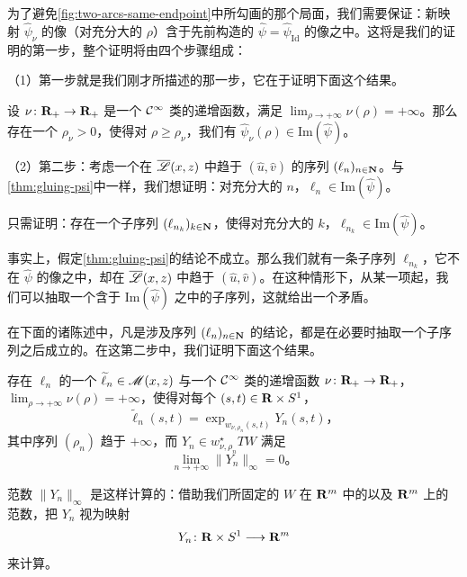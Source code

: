 为了避免\cref{fig:two-arcs-same-endpoint}中所勾画的那个局面，我们需要保证：新映射 $\widehat{\psi}_{\nu}$ 的像（对充分大的 $\rho$）含于先前构造的\trGluing{} $\widehat{\psi}=\widehat{\psi}_{\mathrm{Id}}$ 的像之中。这将是我们的证明的第一步，整个证明将由四个步骤组成：

（1）第一步就是我们刚才所描述的那一步，它在于证明下面这个结果。

\begin{proposition}\label{thm:psinu-image-contained}
设 $\nu\colon\mathbf{R}_{+}\to\mathbf{R}_{+}$ 是一个 $\mathcal{C}^{\infty}$ 类的递增函数，满足 $\lim_{\rho\to+\infty}\nu(\rho)=+\infty$。那么存在一个 $\rho_{\nu}>0$，使得对 $\rho\ge\rho_{\nu}$，我们有 $\widehat{\psi}_{\nu}(\rho)\in\mathrm{Im}(\widehat{\psi})$。
\end{proposition}

（2）第二步：考虑一个在 $\overline{\mathscr{L}}(x,z)$ 中趋于 $(\widehat{u},\widehat{v})$ 的序列 $(\ell_{n})_{n\in\mathbf{N}}$。与\cref{thm:gluing-psi}中一样，我们想证明：对充分大的 $n$，$\ell_{n}\in\mathrm{Im}(\widehat{\psi})$。

\begin{remark}\label{thm:subsequence-suffices}
只需证明：存在一个子序列 $(\ell_{n_{k}})_{k\in\mathbf{N}}$，使得对充分大的 $k$，$\ell_{n_{k}}\in\mathrm{Im}(\widehat{\psi})$。
\end{remark}

事实上，假定\cref{thm:gluing-psi}的结论不成立。那么我们就有一条子序列 $\ell_{n_{k}}$，它不在 $\widehat{\psi}$ 的像之中，却在 $\overline{\mathscr{L}}(x,z)$ 中趋于 $(\widehat{u},\widehat{v})$。在这种情形下，从某一项起，我们可以抽取一个含于 $\mathrm{Im}(\widehat{\psi})$ 之中的子序列，这就给出一个矛盾。

在下面的诸陈述中，凡是涉及序列 $(\ell_{n})_{n\in\mathbf{N}}$ 的结论，都是在必要时抽取一个子序列之后成立的。在这第二步中，我们证明下面这个结果。

\begin{proposition}\label{thm:lift-exp-decay}
存在 $\ell_{n}$ 的一个\trLift{} $\widetilde{\ell}_{n}\in\mathscr{M}(x,z)$ 与一个 $\mathcal{C}^{\infty}$ 类的递增函数 $\nu\colon\mathbf{R}_{+}\to\mathbf{R}_{+}$，$\lim_{\rho\to+\infty}\nu(\rho)=+\infty$，使得对每个 $(s,t)\in\mathbf{R}\times S^{1}$，
\[
\widetilde{\ell}_{n}(s,t)=\exp_{w_{\nu,\rho_{n}}(s,t)}Y_{n}(s,t)\text{，}
\]
其中序列 $(\rho_{n})$ 趋于 $+\infty$，而 $Y_{n}\in w_{\nu,\rho_{n}}^{\star}TW$ 满足
\[
\lim_{n\to+\infty}\|Y_{n}\|_{\infty}=0\text{。}
\]
\end{proposition}

范数 $\|Y_{n}\|_{\infty}$ 是这样计算的：借助我们所固定的 $W$ 在 $\mathbf{R}^{m}$ 中的\trEmbedding{}以及 $\mathbf{R}^{m}$ 上的\trEuclidean{}范数，把 $Y_{n}$ 视为映射
\[
Y_{n}\colon\mathbf{R}\times S^{1}\longrightarrow\mathbf{R}^{m}
\]
来计算。

